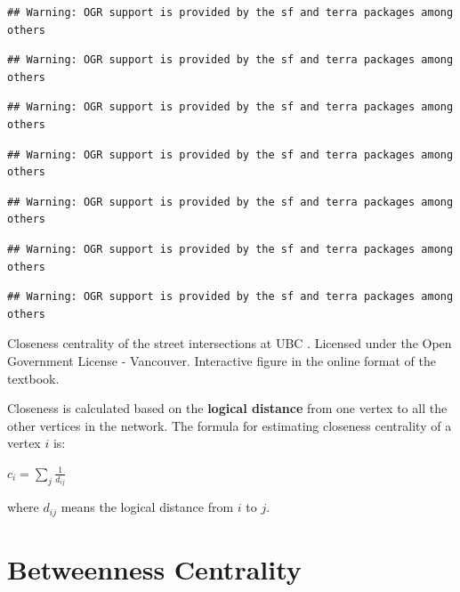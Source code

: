 \documentclass[
]{book}
\begin{document}
\begin{verbatim}
## Warning: OGR support is provided by the sf and terra packages among others
\end{verbatim}

\begin{verbatim}
## Warning: OGR support is provided by the sf and terra packages among others
\end{verbatim}

\begin{verbatim}
## Warning: OGR support is provided by the sf and terra packages among others
\end{verbatim}

\begin{verbatim}
## Warning: OGR support is provided by the sf and terra packages among others
\end{verbatim}

\begin{verbatim}
## Warning: OGR support is provided by the sf and terra packages among others
\end{verbatim}

\begin{verbatim}
## Warning: OGR support is provided by the sf and terra packages among others
\end{verbatim}

\begin{verbatim}
## Warning: OGR support is provided by the sf and terra packages among others
\end{verbatim}

\label{fig:8-closeness-centrality-UBC}Closeness centrality of the street intersections at UBC \citep{city_of_vancouver_open_nodate}. Licensed under the Open Government License - Vancouver. Interactive figure in the online format of the textbook.

Closeness is calculated based on the \textbf{logical distance} from one vertex to all the other vertices in the network. The formula for estimating closeness centrality of a vertex \(i\) is:

\(c_i = \sum\limits_{j} \frac{1}{d_{ij}}\)

where \(d_{ij}\) means the logical distance from \(i\) to \(j\).

\hypertarget{betweenness-centrality}{%
\section{Betweenness Centrality}\label{betweenness-centrality}}
\end{document}
